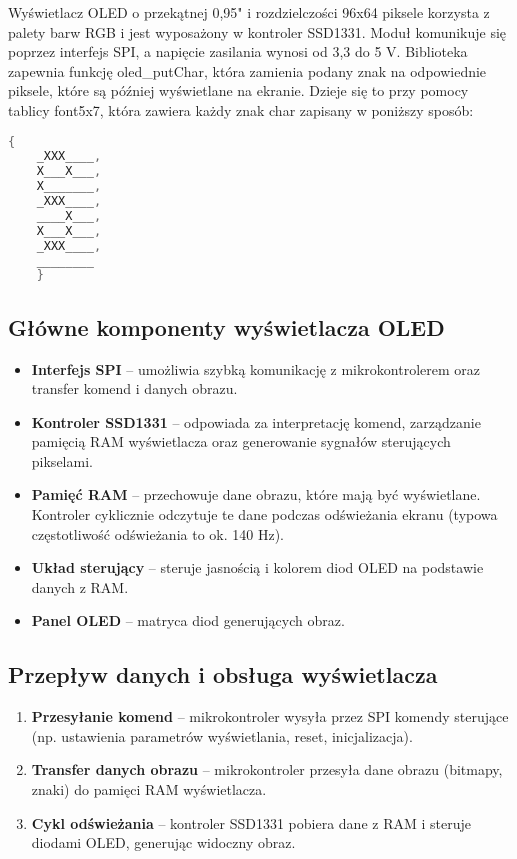\documentclass[a4paper,12pt]{report}
\begin{document}
Wyświetlacz OLED o przekątnej 0,95" i rozdzielczości 96x64 piksele korzysta z palety barw RGB i jest wyposażony w kontroler SSD1331. Moduł komunikuje się poprzez interfejs SPI, a napięcie zasilania wynosi od 3,3 do 5 V. Biblioteka zapewnia funkcję oled\_putChar, która zamienia podany znak na odpowiednie piksele, które są później wyświetlane na ekranie. Dzieje się to przy pomocy tablicy font5x7, która zawiera każdy znak char zapisany w poniższy sposób:
\begin{lstlisting}[language=C]
    {
    _XXX____,
    X___X___,
    X_______,
    _XXX____,
    ____X___,
    X___X___,
    _XXX____,
    ________
    }
\end{lstlisting}

\subsection{Główne komponenty wyświetlacza OLED}

\begin{itemize}
    \item \textbf{Interfejs SPI} – umożliwia szybką komunikację z mikrokontrolerem oraz transfer komend i danych obrazu.
    \item \textbf{Kontroler SSD1331} – odpowiada za interpretację komend, zarządzanie pamięcią RAM wyświetlacza oraz generowanie sygnałów sterujących pikselami.
    \item \textbf{Pamięć RAM} – przechowuje dane obrazu, które mają być wyświetlane. Kontroler cyklicznie odczytuje te dane podczas odświeżania ekranu (typowa częstotliwość odświeżania to ok. 140 Hz).
    \item \textbf{Układ sterujący} – steruje jasnością i kolorem diod OLED na podstawie danych z RAM.
    \item \textbf{Panel OLED} – matryca diod generujących obraz.
\end{itemize}

\subsection{Przepływ danych i obsługa wyświetlacza}

\begin{enumerate}
    \item \textbf{Przesyłanie komend} – mikrokontroler wysyła przez SPI komendy sterujące (np. ustawienia parametrów wyświetlania, reset, inicjalizacja).
    \item \textbf{Transfer danych obrazu} – mikrokontroler przesyła dane obrazu (bitmapy, znaki) do pamięci RAM wyświetlacza.
    \item \textbf{Cykl odświeżania} – kontroler SSD1331 pobiera dane z RAM i steruje diodami OLED, generując widoczny obraz.
\end{enumerate}
\end{document}

